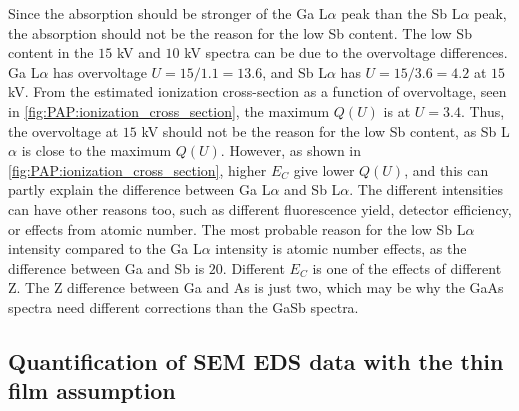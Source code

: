 Since the absorption should be stronger of the Ga L$\alpha$ peak than the Sb L$\alpha$ peak, the absorption should not be the reason for the low Sb content.
The low Sb content in the $15$ kV and $10$ kV spectra can be due to the overvoltage differences.
Ga L$\alpha$ has overvoltage $U = 15/1.1 = 13.6$, and Sb L$\alpha$ has $U = 15/3.6 = 4.2$ at $15$ kV.
From the estimated ionization cross-section as a function of overvoltage, seen in \cref{fig:PAP:ionization_cross_section}, the maximum $Q(U)$ is at $U = 3.4$.
Thus, the overvoltage at $15$ kV should not be the reason for the low Sb content, as Sb L$\alpha$ is close to the maximum $Q(U)$.
However, as shown in \cref{fig:PAP:ionization_cross_section}, higher $E_C$ give lower $Q(U)$, and this can partly explain the difference between Ga L$\alpha$ and Sb L$\alpha$.
The different intensities can have other reasons too, such as different fluorescence yield, detector efficiency, or effects from atomic number.
The most probable reason for the low Sb L$\alpha$ intensity compared to the Ga L$\alpha$ intensity is atomic number effects, as the difference between Ga and Sb is $20$.
Different $E_C$ is one of the effects of different Z.
The Z difference between Ga and As is just two, which may be why the GaAs spectra need different corrections than the GaSb spectra.






\subsection{Quantification of SEM EDS data with the thin film assumption}
\label{discussion:quantitative:thin_film_assumption}

